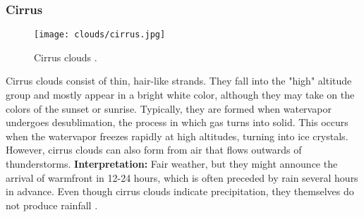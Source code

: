 
\pagebreak

\subsubsection{Cirrus}
\begin{wrapfigure}[10]{r}{6.3cm}
    \vspace{-\baselineskip}
    \texttt{[image: clouds/cirrus.jpg]}
    \caption{Cirrus clouds \protect\cite{cloudtypes:wiki:cirrus}.}
    \label{img:clouds:cirrus}
\end{wrapfigure}
Cirrus clouds consist of thin, hair-like strands.
They fall into the "high" altitude group and mostly appear in a bright white color, although they may take on the colors of the sunset or sunrise.
Typically, they are formed when \gls{watervapor} undergoes \gls{desublimation}, the process in which gas turns into solid. This occurs when the \gls{watervapor} freezes rapidly at high altitudes, turning into ice crystals.
\\
\noindent
However, cirrus clouds can also form from air that flows outwards of thunderstorms.
\emptyline
\textbf{Interpretation:} Fair weather, but they might announce the arrival of \gls{warmfront} in 12-24 hours, which is often preceded by rain several hours in advance.
Even though cirrus clouds indicate \gls{precipitation}, they themselves do not produce rainfall \cite{predict:weather}.

